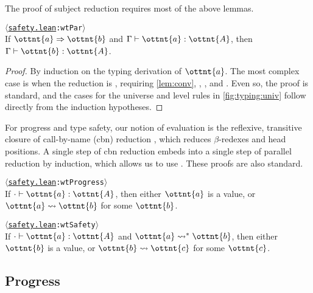 \documentclass[a4paper,UKenglish,cleveref,autoref,thm-restate]{lipics-v2021}
\newcommand{\repo}{https://github.com/ionathanch/TTBFL}
\newcommand{\thmref}[2]{%
  $\langle$\href{\repo/tree/main/src/#1}{\texttt{#1}}\texttt{:#2}$\rangle$%
}
\begin{document}
The proof of subject reduction requires most of the above lemmas.

\begin{theorem} \thmref{safety.lean}{wtPar} \label{lem:preservation} \\
  If $ \ottnt{a}  \Rightarrow  \ottnt{b} $ and $ \Gamma  \vdash  \ottnt{a}  \mathrel{:}  \ottnt{A} $, then $ \Gamma  \vdash  \ottnt{b}  \mathrel{:}  \ottnt{A} $.
\end{theorem}

\begin{proof}
  By induction on the typing derivation of $\ottnt{a}$.
  The most complex case is when the reduction is ,
  requiring \cref{lem:conv}, ,
  , and .
  Even so, the proof is standard,
  and the cases for the universe and level rules in \cref{fig:typing:univ}
  follow directly from the induction hypotheses.
\end{proof}

For progress and type safety, our notion of evaluation is
the reflexive, transitive closure 
of call-by-name (cbn) reduction ,
which reduces $\beta$-redexes and head positions.
A single step of cbn reduction embeds into
a single step of parallel reduction by induction,
which allows us to use .
These proofs are also standard.

\begin{lemma}[Progress] \thmref{safety.lean}{wtProgress} \label{lem:progress} \\
  If $  \cdot   \vdash  \ottnt{a}  \mathrel{:}  \ottnt{A} $, then either $\ottnt{a}$ is a value,
  or $ \ottnt{a}  \rightsquigarrow  \ottnt{b} $ for some $\ottnt{b}$.
\end{lemma}

\begin{theorem} \thmref{safety.lean}{wtSafety} \\
  If $  \cdot   \vdash  \ottnt{a}  \mathrel{:}  \ottnt{A} $ and $ \ottnt{a}  \rightsquigarrow^\ast  \ottnt{b} $,
  then either $\ottnt{b}$ is a value,
  or $ \ottnt{b}  \rightsquigarrow  \ottnt{c} $ for some $\ottnt{c}$.
\end{theorem}

\iffalse
\subsection{Progress}
\end{document}
